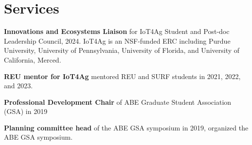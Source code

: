 \documentclass[10pt]{article}
\begin{document}
\section{Services}
\begin{description}
    \item \textbf{Innovations and Ecosystems Liaison} for IoT4Ag Student and Post-doc Leadership Council, 2024. IoT4Ag is an NSF-funded ERC including Purdue University, University of Pennsylvania, University of Florida, and University of California, Merced.
    \item \textbf{REU mentor for IoT4Ag} mentored REU and SURF students in 2021, 2022, and 2023.
    \item \textbf{Professional Development Chair} of ABE Graduate Student Association (GSA) in 2019 
    \item \textbf{Planning committee head} of the ABE GSA symposium in 2019, organized the ABE GSA symposium.
\end{description}
\end{document}
